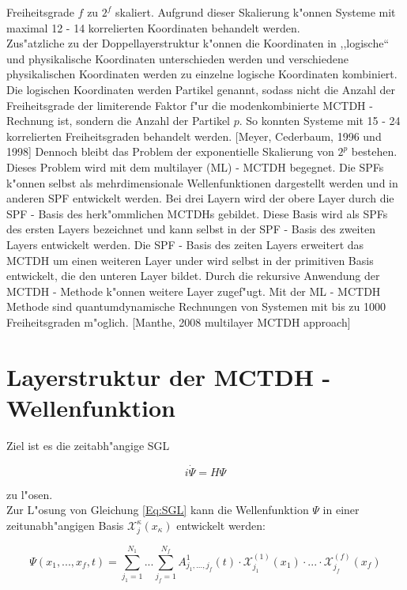 Freiheitsgrade $f$ zu $2^f$ skaliert. Aufgrund dieser Skalierung k"onnen Systeme mit maximal 12 - 14 korrelierten Koordinaten behandelt werden.
  \\ Zus"atzliche zu der Doppellayerstruktur k"onnen die Koordinaten in ,,logische`` und physikalische Koordinaten unterschieden werden und
verschiedene physikalischen Koordinaten werden zu einzelne logische Koordinaten kombiniert. Die logischen Koordinaten werden Partikel genannt, sodass
nicht die Anzahl der Freiheitsgrade der limiterende Faktor f"ur die modenkombinierte MCTDH - Rechnung ist,
sondern die Anzahl der Partikel $p$. So konnten Systeme mit 15 - 24 korrelierten Freiheitsgraden behandelt werden. [Meyer, Cederbaum, 1996 und 1998]
Dennoch  bleibt das Problem der exponentielle Skalierung von $2^p$ bestehen.
  \\Dieses Problem wird mit dem multilayer (ML) - MCTDH begegnet.
Die SPFs k"onnen selbst als mehrdimensionale Wellenfunktionen dargestellt werden und in anderen SPF entwickelt werden.
Bei drei Layern wird der obere Layer durch die SPF - Basis des herk"ommlichen MCTDHs gebildet. Diese Basis wird als SPFs des ersten Layers bezeichnet
und kann selbst in der SPF - Basis des zweiten Layers entwickelt werden. Die SPF - Basis des zeiten Layers erweitert das MCTDH um einen weiteren Layer under
wird selbst in der primitiven Basis entwickelt, die den unteren Layer bildet.
Durch die rekursive Anwendung der MCTDH - Methode k"onnen weitere Layer zugef"ugt.
Mit der ML - MCTDH Methode sind quantumdynamische Rechnungen von Systemen mit bis zu 1000 Freiheitsgraden m"oglich. [Manthe, 2008 multilayer MCTDH approach]


\section{Layerstruktur der MCTDH - Wellenfunktion}

Ziel ist es die zeitabh"angige SGL

\begin{equation}
i\dot{\Psi} = H \Psi
\label{Eq:SGL}
\end{equation}

zu l"osen.
  \\Zur L"osung von Gleichung \ref{Eq:SGL} kann die Wellenfunktion $\Psi$ in einer zeitunabh"angigen Basis $\mathcal{X}^{\kappa}_{j}(x_{\kappa})$ entwickelt werden:

 \begin{equation}
 \Psi(x_{1},..., x_{f}, t)=\sum^{N_{1}}_{j_{1}=1} ... \sum^{N_{f}}_{j_{f}=1} A^{1}_{j_{1}, ..., j_{f}}(t)\cdot \mathcal{X}^{(1)}_{j_{1}}(x_{1}) \cdot ... \cdot \mathcal{X}^{(f)}_{j_{f}}(x_{f})
 \label{Eq:Std_wave}
 \end{equation}

